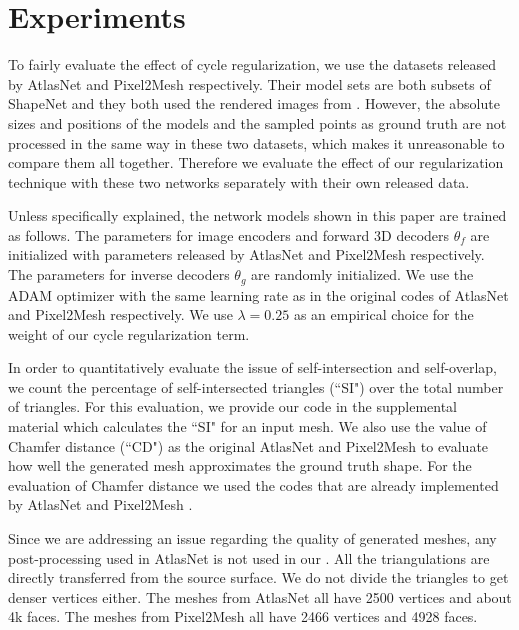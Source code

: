 \section{Experiments}
 To fairly evaluate the effect of cycle regularization, we use the datasets released by AtlasNet and Pixel2Mesh respectively. Their model sets are both subsets of ShapeNet \cite{shapenetdata} and they both used the rendered images from \cite{3DR2N2} . However, the absolute sizes and positions of the models and the sampled points as ground truth are not processed in the same way in these two datasets, which makes it unreasonable to compare them all together. Therefore we evaluate the effect of our regularization technique with these two networks separately with their own released data.

Unless specifically explained, the network models shown in this paper are trained as follows. The parameters for image encoders and forward 3D decoders $\theta_f$ are initialized with parameters released by AtlasNet \cite{atlasnet} and Pixel2Mesh \cite{pixel2mesh} respectively. The parameters for inverse decoders $\theta_g$ are randomly initialized. We use the ADAM \cite{adam} optimizer with the same learning rate as in the original codes of AtlasNet and Pixel2Mesh respectively. We use $\lambda=0.25$ as an empirical choice for the weight of our cycle regularization term.

In order to quantitatively evaluate the issue of self-intersection and self-overlap, we count the percentage of self-intersected triangles (``SI") over the total number of triangles. For this evaluation, we provide our code in the supplemental material which calculates the ``SI" for an input mesh.  
We also use the value of Chamfer distance (``CD") as the original AtlasNet and Pixel2Mesh to evaluate how well the generated mesh approximates the ground truth shape. For the evaluation of Chamfer distance we used the codes that are already implemented by AtlasNet \cite{atlasnet} and Pixel2Mesh \cite{pixel2mesh}.

 Since we are addressing an issue regarding the quality of generated meshes, any post-processing used in AtlasNet \cite{atlasnet} is not used in our . All the triangulations are directly transferred from the source surface. We do not divide the triangles to get denser vertices either. The meshes from AtlasNet all have 2500 vertices and about 4k faces. The meshes from Pixel2Mesh all have 2466 vertices and 4928 faces.

